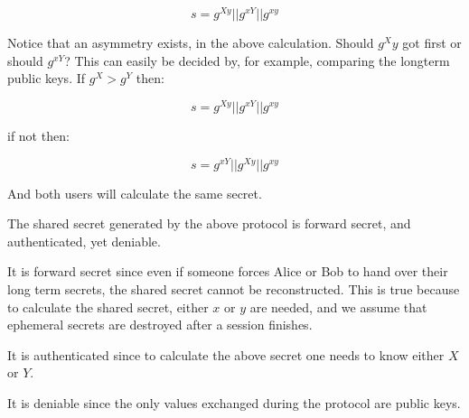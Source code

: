 \[
  s = g^{Xy} || g^{xY} || g^{xy}
\]

Notice that an asymmetry exists, in the above calculation.
Should $g^Xy$ got first or should $g^{xY}$?
This can easily be decided by, for example, comparing the longterm public keys.
If $g^X > g^Y$ then:

\[
  s = g^{Xy} || g^{xY} || g^{xy}
\]

if not then:

\[
  s = g^{xY}|| g^{Xy} || g^{xy}
\]

And both users will calculate the same secret.

The shared secret generated by the above protocol is forward secret, and authenticated, yet deniable.

It is forward secret since even if someone forces Alice or Bob to hand over their long term secrets, the shared secret cannot be reconstructed.
This is true because to calculate the shared secret, either $x$ or $y$ are needed, and we assume that ephemeral secrets are destroyed after a session finishes.

It is authenticated since to calculate the above secret one needs to know either $X$ or $Y$.

It is deniable since the only values exchanged during the protocol are public keys.
